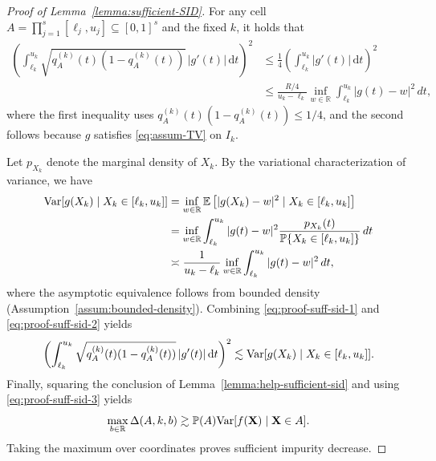 \documentclass[11pt]{article}
\theoremstyle{plain}
\theoremstyle{definition}
\theoremstyle{remark}
\theoremstyle{plain}
\newcommand{\bX}{\mathbf{X}}
\renewcommand{\P}{\mathbb{P}}
\newcommand{\E}{\mathbb{E}}
\newcommand{\Var}{\textnormal{Var}}
\newcommand{\1}{\mathbbm{1}}
\begin{document}
\begin{proof}[Proof of Lemma~\ref{lemma:sufficient-SID}]
    For any cell $A = \prod_{j=1}^s [\ell_j, u_j] \subseteq [0, 1]^s$ and the fixed $k$, it holds that
    \begin{equation}
    \begin{aligned}\label{eq:proof-suff-sid-1}
        \left( \int_{\ell_k}^{u_k} \sqrt{q_A^{(k)}(t)(1 - q_A^{(k)}(t))}\,|g'(t)|\,\mathrm{d}t \right)^2 & \leq \frac{1}{4} \left( \int_{\ell_k}^{u_k} |g'(t)| \, \mathrm{d}t \right)^2 \\
        & \leq \frac{R/4}{u_k - \ell_k} \inf_{w \in \mathbb{R}} \int_{\ell_k}^{u_k} |g(t) - w|^2 \, dt,
    \end{aligned}
    \end{equation}
    where the first inequality uses $q_A^{(k)}(t)(1-q_A^{(k)}(t))\leq 1/4$, and the second follows because $g$ satisfies \eqref{eq:assum-TV} on $I_k$.

    Let $p_{X_k}$ denote the marginal density of $X_k$. By the variational characterization of variance, we have
    \begin{equation}\label{eq:proof-suff-sid-2}
    \begin{aligned}
        \Var[g(X_k) \mid X_k \in [\ell_k,u_k]]
        &= \inf_{w \in \mathbb{R}} \E\left[|g(X_k) - w|^2 \mid X_k \in [\ell_k, u_k]\right] \\
        &= \inf_{w \in \mathbb{R}} \int_{\ell_k}^{u_k} |g(t) - w|^2 \frac{p_{X_k}(t)}{\P\{X_k \in [\ell_k,u_k]\}} \, dt \\
        &\asymp \frac{1}{u_k - \ell_k} \inf_{w \in \mathbb{R}} \int_{\ell_k}^{u_k} |g(t) - w|^2 \, dt,
    \end{aligned}
    \end{equation}
    where the asymptotic equivalence follows from bounded density (Assumption~\ref{assum:bounded-density}). Combining \eqref{eq:proof-suff-sid-1} and \eqref{eq:proof-suff-sid-2} yields
    \begin{equation}\label{eq:proof-suff-sid-3}
    \begin{aligned}
        \left( \int_{\ell_k}^{u_k} \sqrt{q_A^{(k)}(t)(1 - q_A^{(k)}(t))}\,|g'(t)|\,\mathrm{d}t \right)^2
        \lesssim \Var[g(X_k) \mid X_k \in [\ell_k,u_k]].
    \end{aligned}
    \end{equation}
    Finally, squaring the conclusion of
    Lemma~\ref{lemma:help-sufficient-sid} and using
    \eqref{eq:proof-suff-sid-3} yields
    \[
        \max_{b\in\mathbb R}\Delta(A,k,b)
        \gtrsim
        \P(A)\Var[f(\bX)\mid\bX\in A].
    \]
    Taking the maximum over coordinates proves sufficient impurity decrease.
\end{proof}
\end{document}
